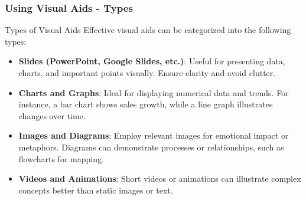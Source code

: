 \documentclass[aspectratio=169]{beamer}
\begin{document}
\begin{frame}[fragile]
    \frametitle{Using Visual Aids - Types}
    \begin{block}{Types of Visual Aids}
        Effective visual aids can be categorized into the following types:
    \end{block}
    
    \begin{itemize}
        \item \textbf{Slides (PowerPoint, Google Slides, etc.)}: Useful for presenting data, charts, and important points visually. Ensure clarity and avoid clutter.
        
        \item \textbf{Charts and Graphs}: Ideal for displaying numerical data and trends. For instance, a bar chart shows sales growth, while a line graph illustrates changes over time.
        
        \item \textbf{Images and Diagrams}: Employ relevant images for emotional impact or metaphors. Diagrams can demonstrate processes or relationships, such as flowcharts for mapping.
        
        \item \textbf{Videos and Animations}: Short videos or animations can illustrate complex concepts better than static images or text.
    \end{itemize}
\end{frame}
\end{document}
